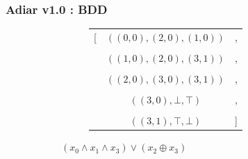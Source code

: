 \documentclass[english, aspectratio=169]{beamer}
\newcommand{\triple}[3]{\ensuremath{(#1, #2, #3)}}
\begin{document}
\begin{frame}
  \frametitle{Adiar v1.0 : BDD}

  \begin{figure}
    \centering

    \begin{subfigure}{0.49\linewidth}
      \centering

      \begin{subfigure}[b]{0.33\linewidth}
        \centering

        \begin{tikzpicture}[scale=0.6, every node/.style={transform shape}]
          
        \end{tikzpicture}
      \end{subfigure}
      \begin{subfigure}[b]{0.55\linewidth}
        \centering
        { \tiny
          \begin{tabular}{r c l}
            [ & $\triple{(0,0)}{(2,0)}{(1,0)}$ & ,
            \\ \\
              & $\triple{(1,0)}{(2,0)}{(3,1)}$ & ,
            \\ \\
              & $\triple{(2,0)}{(3,0)}{(3,1)}$ & ,
            \\ \\
              & $\triple{(3,0)}{\bot}{\top}$   & ,
            \\ \\
              & $\triple{(3,1)}{\top}{\bot}$   & ]
          \end{tabular}
          \vspace{6pt}
        }
      \end{subfigure}

      \caption{$(x_0 \wedge x_1 \wedge x_3) \vee (x_2 \oplus x_3)$}
    \end{subfigure}
    \begin{subfigure}{0.49\linewidth}
      \centering


\end{subfigure}
\end{figure}
\end{frame}
\end{document}
